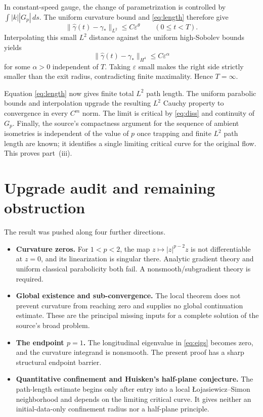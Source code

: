 \documentclass[11pt]{article}
\begin{document}
In constant-speed gauge, the change of parametrization is controlled by
$\int|k||G_p|\,ds$.  The uniform curvature bound and \eqref{eq:length}
therefore give
\[
 \|\widehat\gamma(t)-\gamma_*\|_{L^2}
 \le C\varepsilon^\theta\qquad(0\le t<T).
\]
Interpolating this small $L^2$ distance against the uniform high-Sobolev
bounds yields
\[
 \|\widehat\gamma(t)-\gamma_*\|_{H^4}
 \le C\varepsilon^\alpha
\]
for some $\alpha>0$ independent of $T$.  Taking $\varepsilon$ small makes
the right side strictly smaller than the exit radius, contradicting finite
maximality.  Hence $T=\infty$.

Equation \eqref{eq:length} now gives finite total $L^2$ path length.  The
uniform parabolic bounds and interpolation upgrade the resulting $L^2$
Cauchy property to convergence in every $C^m$ norm.  The limit is critical
by \eqref{eq:diss} and continuity of $G_p$.  Finally, the source's compactness
argument for the sequence of ambient isometries is independent of the value
of $p$ once trapping and finite $L^2$ path length are known; it identifies a
single limiting critical curve for the original flow.  This proves
part~\textup{(iii)}.

\section*{Upgrade audit and remaining obstruction}

The result was pushed along four further directions.
\begin{itemize}
\item \textbf{Curvature zeros.}  For $1<p<2$, the map
$z\mapsto|z|^{p-2}z$ is not differentiable at $z=0$, and its linearization
is singular there.  Analytic gradient theory and uniform classical
parabolicity both fail.  A nonsmooth/subgradient theory is required.
\item \textbf{Global existence and sub-convergence.}  The local theorem does
not prevent curvature from reaching zero and supplies no global continuation
estimate.  These are the principal missing inputs for a complete solution of
the source's broad problem.
\item \textbf{The endpoint $p=1$.}  The longitudinal eigenvalue in
\eqref{eq:eigs} becomes zero, and the curvature integrand is nonsmooth.  The
present proof has a sharp structural endpoint barrier.
\item \textbf{Quantitative confinement and Huisken's half-plane conjecture.}
The path-length estimate begins only after entry into a local
\L ojasiewicz--Simon neighborhood and depends on the limiting critical curve.
It gives neither an initial-data-only confinement radius nor a half-plane
principle.
\end{itemize}
\end{document}
